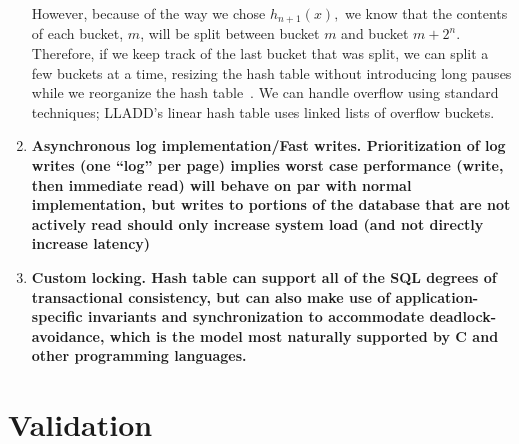 \documentclass[letterpaper,english]{article}
\begin{document}
\begin{enumerate}
However, because of the way we chose $h_{n+1}(x),$ we know that the
contents of each bucket, $m$, will be split between bucket $m$ and
bucket $m+2^{n}$. Therefore, if we keep track of the last bucket
that was split, we can split a few buckets at a time, resizing the
hash table without introducing long pauses while we reorganize the
hash table~\cite{lht}. We can handle overflow using standard techniques;
LLADD's linear hash table uses linked lists of overflow buckets.


  \item {\bf Asynchronous log implementation/Fast writes. Prioritization of
  log writes (one {}``log'' per page) implies worst case performance
  (write, then immediate read) will behave on par with normal
  implementation, but writes to portions of the database that are not
  actively read should only increase system load (and not directly
  increase latency)}

  \item {\bf Custom locking. Hash table can support all of the SQL degrees
  of transactional consistency, but can also make use of
  application-specific invariants and synchronization to accommodate
  deadlock-avoidance, which is the model most naturally supported by C
  and other programming languages.}


\end{enumerate}

\section{Validation}
\end{document}
